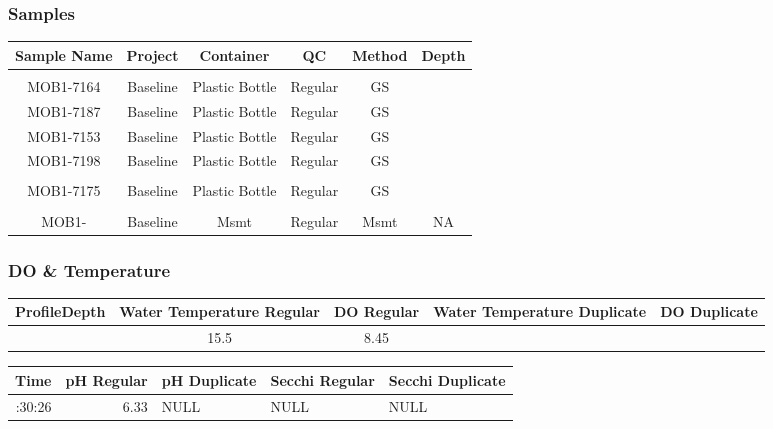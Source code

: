 \documentclass[
  letterpaper,
  DIV=11,
  numbers=noendperiod]{scrartcl}
\begin{document}
\subsubsection{Samples}

\begin{longtable*}{cccccc}
\toprule
Sample Name & Project & Container & QC & Method & Depth \\ 
\midrule\addlinespace[2.5pt]
 \\ 
\midrule\addlinespace[2.5pt]
MOB1-7164 & Baseline & Plastic Bottle & Regular & GS &  \\ 
MOB1-7187 & Baseline & Plastic Bottle & Regular & GS &  \\ 
MOB1-7153 & Baseline & Plastic Bottle & Regular & GS &  \\ 
MOB1-7198 & Baseline & Plastic Bottle & Regular & GS &  \\ 
\midrule\addlinespace[2.5pt]
 \\ 
\midrule\addlinespace[2.5pt]
MOB1-7175 & Baseline & Plastic Bottle & Regular & GS &  \\ 
\midrule\addlinespace[2.5pt]
 \\ 
\midrule\addlinespace[2.5pt]
MOB1- & Baseline & Msmt & Regular & Msmt & NA \\ 
\bottomrule
\end{longtable*}

\subsubsection{DO \& Temperature}

\begin{longtable*}{rcccc}
\toprule
ProfileDepth & Water Temperature Regular & DO Regular & Water Temperature Duplicate & DO Duplicate \\ 
\midrule{} & 15.5 & 8.45 &  &  \\ 
\bottomrule
\end{longtable*}

\begin{longtable*}{rrlll}
\toprule
Time & pH Regular & pH Duplicate & Secchi Regular & Secchi Duplicate \\ 
\midrule{}:30:26 & 6.33 & NULL & NULL & NULL \\ 
\bottomrule
\end{longtable*}
\end{document}
